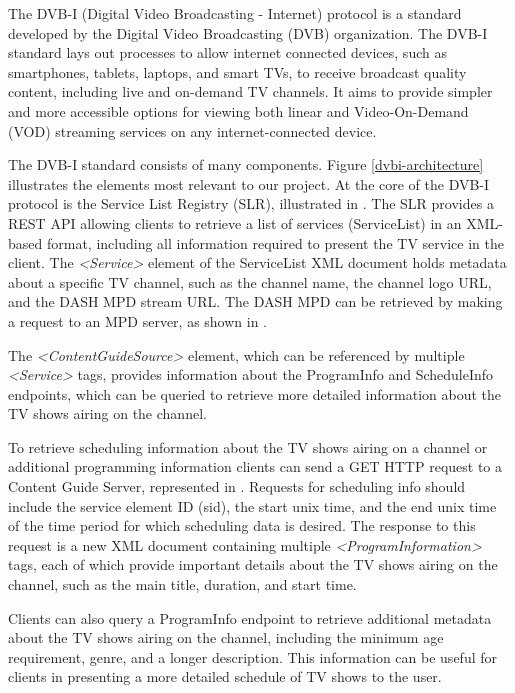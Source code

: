 \documentclass[conference]{IEEEtran}
\begin{document}
The DVB-I (Digital Video Broadcasting - Internet) \cite{DVBI-I} protocol is a standard developed by the Digital Video Broadcasting (DVB) \cite{DVB} organization. The DVB-I standard lays out processes to allow internet connected devices, such as smartphones, tablets, laptops, and smart TVs, to receive broadcast quality content, including live and on-demand TV channels. It aims to provide simpler and more accessible options for viewing both linear and Video-On-Demand (VOD) streaming services on any internet-connected device.

The DVB-I standard consists of many components. Figure \ref{dvbi-architecture} illustrates the elements most relevant to our project. At the core of the DVB-I protocol is the Service List Registry (SLR), illustrated in . The SLR provides a REST API allowing clients to retrieve a list of services (ServiceList) in an XML-based format, including all information required to present the TV service in the client. The \textit{<Service>} element of the ServiceList XML document holds metadata about a specific TV channel, such as the channel name, the channel logo URL, and the DASH MPD stream URL. The DASH MPD can be retrieved by making a request to an MPD server, as shown in  .

The \textit{<ContentGuideSource>} element, which can be referenced by multiple \textit{<Service>} tags, provides information about the ProgramInfo and ScheduleInfo endpoints, which can be queried to retrieve more detailed information about the TV shows airing on the channel.

To retrieve scheduling information about the TV shows airing on a channel or additional programming information clients can send a GET HTTP request to a Content Guide Server, represented in . Requests for scheduling info should include the service element ID (sid), the start unix time, and the end unix time of the time period for which scheduling data is desired. The response to this request is a new XML document containing multiple \textit{<ProgramInformation>} tags, each of which provide important details about the TV shows airing on the channel, such as the main title, duration, and start time.

Clients can also query a ProgramInfo endpoint to retrieve additional metadata about the TV shows airing on the channel, including the minimum age requirement, genre, and a longer description. This information can be useful for clients in presenting a more detailed schedule of TV shows to the user.
\end{document}
